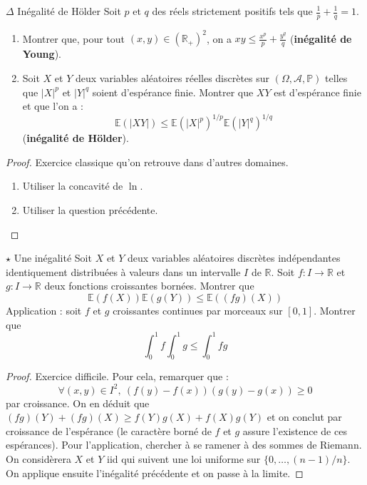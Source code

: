 \documentclass[french,a4paper]{article}
\renewcommand{\P}{\mathbb{P}}
\newcommand{\R}{\mathbb{R}}
\newcommand{\E}{\mathbb{E}}
\theoremstyle{plain}
\theoremstyle{definition}
\theoremstyle{remark}
\begin{document}
\begin{ex}[Moulin.66]{$\Delta$ Inégalité de Hölder}
	Soit $p$ et $q$ des réels strictement positifs tels que $\displaystyle\frac{1}{p}+\frac{1}{q}=1$.
	\begin{enumerate}
		\item Montrer que, pour tout $(x,y)\in(\R_+)^2$, on a $\displaystyle xy\leqslant\frac{x^p}{p}+\frac{y^q}{q}$ (\textbf{inégalité de Young}).
		\item Soit $X$ et $Y$ deux variables aléatoires réelles discrètes sur $(\Omega,\mathcal{A},\P)$ telles que $\lvert X\rvert^p$ et $\lvert Y\rvert^q$ soient d'espérance finie. Montrer que $XY$ est d'espérance finie et que l'on a : $$\E(\lvert XY\rvert)\leqslant\E(\lvert X\rvert^p)^{1/p}\E(\lvert Y\rvert^q)^{1/q}$$ (\textbf{inégalité de Hölder}).
	\end{enumerate}
\end{ex}
\begin{proof}
	Exercice classique qu'on retrouve dans d'autres domaines.
	\begin{enumerate}
		\item Utiliser la concavité de $\ln$.
		\item Utiliser la question précédente.
	\end{enumerate}
\end{proof}

\begin{ex}[Moulin.67]{$\star$ Une inégalité}
	Soit $X$ et $Y$ deux variables aléatoires discrètes indépendantes identiquement distribuées à valeurs dans un intervalle $I$ de $\R$. Soit $f:I\to\R$ et $g:I\to\R$ deux fonctions croissantes bornées. Montrer que $$\E(f(X))\E(g(Y))\leqslant\E((fg)(X))$$ Application : soit $f$ et $g$ croissantes continues par morceaux sur $[0,1]$. Montrer que $$\int_{0}^{1}f\int_{0}^{1}g\leqslant\int_{0}^{1}fg$$
\end{ex}
\begin{proof}
	Exercice difficile. Pour cela, remarquer que : $$\forall(x,y)\in I^2,\ (f(y)-f(x))(g(y)-g(x))\geqslant0$$ par croissance. On en déduit que $(fg)(Y)+(fg)(X)\geqslant f(Y)g(X)+f(X)g(Y)$ et on conclut par croissance de l'espérance (le caractère borné de $f$ et $g$ assure l'existence de ces espérances). Pour l'application, chercher à se ramener à des sommes de Riemann. On considèrera $X$ et $Y$ iid qui suivent une loi uniforme sur $\{0,\ldots,(n-1)/n\}$. On applique ensuite l'inégalité précédente et on passe à la limite.
\end{proof}
\end{document}
